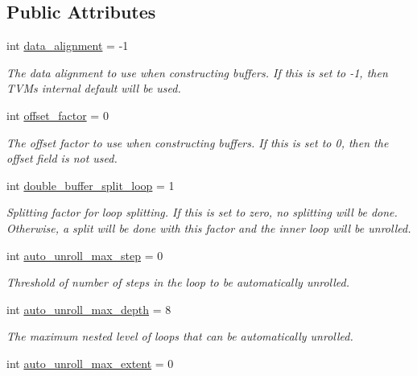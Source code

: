 \subsection*{Public Attributes}
\begin{DoxyCompactItemize}
\item 
int \hyperlink{classtvm_1_1BuildConfigNode_a5e2c8350cb1a96b35bc383a23c1fd397}{data\+\_\+alignment} = -\/1
\begin{DoxyCompactList}\small\item\em The data alignment to use when constructing buffers. If this is set to -\/1, then T\+VM\textquotesingle{}s internal default will be used. \end{DoxyCompactList}\item 
int \hyperlink{classtvm_1_1BuildConfigNode_ab846adeceeb4f6b9b00410b2ce66a4a2}{offset\+\_\+factor} = 0
\begin{DoxyCompactList}\small\item\em The offset factor to use when constructing buffers. If this is set to 0, then the offset field is not used. \end{DoxyCompactList}\item 
int \hyperlink{classtvm_1_1BuildConfigNode_a86e454b099b0da8bf58b0116ac052241}{double\+\_\+buffer\+\_\+split\+\_\+loop} = 1
\begin{DoxyCompactList}\small\item\em Splitting factor for loop splitting. If this is set to zero, no splitting will be done. Otherwise, a split will be done with this factor and the inner loop will be unrolled. \end{DoxyCompactList}\item 
int \hyperlink{classtvm_1_1BuildConfigNode_a906d69e936afa01fa60a816acc66e095}{auto\+\_\+unroll\+\_\+max\+\_\+step} = 0
\begin{DoxyCompactList}\small\item\em Threshold of number of steps in the loop to be automatically unrolled. \end{DoxyCompactList}\item 
int \hyperlink{classtvm_1_1BuildConfigNode_ae1e3ea8be3710e8e91dcb691ea75c460}{auto\+\_\+unroll\+\_\+max\+\_\+depth} = 8
\begin{DoxyCompactList}\small\item\em The maximum nested level of loops that can be automatically unrolled. \end{DoxyCompactList}\item 
int \hyperlink{classtvm_1_1BuildConfigNode_ac2bd9a11784fb5908cff6760e80a2534}{auto\+\_\+unroll\+\_\+max\+\_\+extent} = 0

\end{DoxyCompactItemize}
